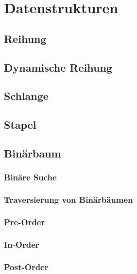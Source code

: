 \section{Datenstrukturen}
\subsection{Reihung}
\subsection{Dynamische Reihung}
\subsection{Schlange}
\subsection{Stapel}
\subsection{Binärbaum}
\subsubsection{Binäre Suche}
\subsubsection{Traversierung von Binärbäumen}
\subsubsection*{Pre-Order}
\subsubsection*{In-Order}
\subsubsection*{Post-Order}
